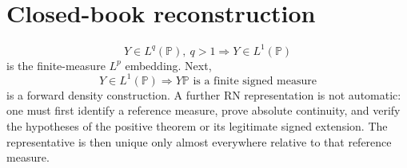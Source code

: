 \section*{Closed-book reconstruction}

\[
\boxed{Y\in L^q(\mathbb P),\ q>1}
\Longrightarrow
\boxed{Y\in L^1(\mathbb P)}
\]
is the finite-measure $L^p$ embedding. Next,
\[
Y\in L^1(\mathbb P)
\Longrightarrow
Y\mathbb P\text{ is a finite signed measure}
\]
is a forward density construction. A further RN representation is not automatic: one must first identify a reference measure, prove absolute continuity, and verify the hypotheses of the positive theorem or its legitimate signed extension. The representative is then unique only almost everywhere relative to that reference measure.
